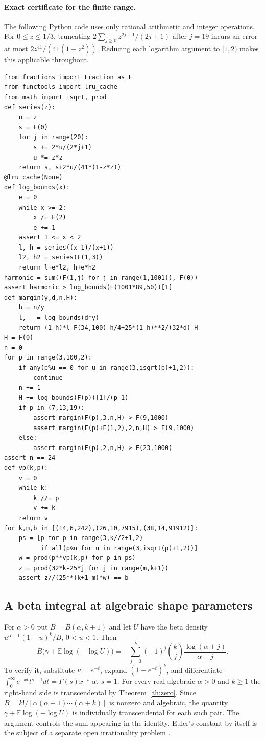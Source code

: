 \documentclass[11pt,a4paper]{article}
\theoremstyle{definition}\newtheorem{definition}[theorem]{Definition}\newtheorem{example}[theorem]{Example}
\theoremstyle{remark}\newtheorem{remark}[theorem]{Remark}
\begin{document}
\paragraph{Exact certificate for the finite range.}
The following Python code uses only rational arithmetic and integer operations. For $0\le z\le1/3$, truncating $2\sum_{j\ge0}z^{2j+1}/(2j+1)$ after $j=19$ incurs an error at most $2z^{41}/(41(1-z^2))$. Reducing each logarithm argument to $[1,2)$ makes this applicable throughout.
\begingroup\small
\begin{verbatim}
from fractions import Fraction as F
from functools import lru_cache
from math import isqrt, prod
def series(z):
    u = z
    s = F(0)
    for j in range(20):
        s += 2*u/(2*j+1)
        u *= z*z
    return s, s+2*u/(41*(1-z*z))
@lru_cache(None)
def log_bounds(x):
    e = 0
    while x >= 2:
        x /= F(2)
        e += 1
    assert 1 <= x < 2
    l, h = series((x-1)/(x+1))
    l2, h2 = series(F(1,3))
    return l+e*l2, h+e*h2
harmonic = sum((F(1,j) for j in range(1,1001)), F(0))
assert harmonic > log_bounds(F(1001*89,50))[1]
def margin(y,d,n,H):
    h = n/y
    l, _ = log_bounds(d*y)
    return (1-h)*l-F(34,100)-h/4+25*(1-h)**2/(32*d)-H
H = F(0)
n = 0
for p in range(3,100,2):
    if any(p%u == 0 for u in range(3,isqrt(p)+1,2)):
        continue
    n += 1
    H += log_bounds(F(p))[1]/(p-1)
    if p in (7,13,19):
        assert margin(F(p),3,n,H) > F(9,1000)
        assert margin(F(p)+F(1,2),2,n,H) > F(9,1000)
    else:
        assert margin(F(p),2,n,H) > F(23,1000)
assert n == 24
def vp(k,p):
    v = 0
    while k:
        k //= p
        v += k
    return v
for k,m,b in [(14,6,242),(26,10,7915),(38,14,91912)]:
    ps = [p for p in range(3,k//2+1,2)
          if all(p%u for u in range(3,isqrt(p)+1,2))]
    w = prod(p**vp(k,p) for p in ps)
    z = prod(32*k-25*j for j in range(m,k+1))
    assert z//(25**(k+1-m)*w) == b
\end{verbatim}
\endgroup
\subsection{A beta integral at algebraic shape parameters}
For $\alpha>0$ put $B=B(\alpha,k+1)$ and let $U$ have the beta density $u^{\alpha-1}(1-u)^k/B$, $0<u<1$. Then
\[
 B\big(\gamma+\mathbb{E}\log(-\log U)\big)
   =-\sum_{j=0}^k(-1)^j\binom{k}{j}
                     \frac{\log(\alpha+j)}{\alpha+j}.
\]
To verify it, substitute $u=e^{-t}$, expand $(1-e^{-t})^k$, and differentiate $\int_0^\infty e^{-xt}t^{s-1}dt=\Gamma(s)x^{-s}$ at $s=1$. For every real algebraic $\alpha>0$ and $k\ge1$ the right-hand side is transcendental by Theorem~\ref{th:zero}. Since $B=k!/[\alpha(\alpha+1)\cdots(\alpha+k)]$ is nonzero and algebraic, the quantity $\gamma+\mathbb{E}\log(-\log U)$ is individually transcendental for each such pair. The argument controls the sum appearing in the identity. Euler's constant by itself is the subject of a separate open irrationality problem \cite{Lagarias}.
\end{document}
